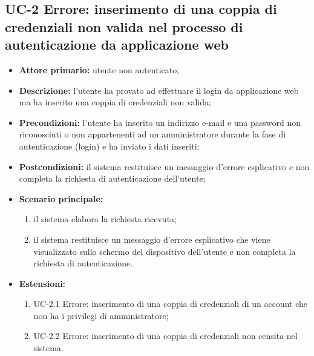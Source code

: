 \subsection{UC-2 Errore: inserimento di una coppia di credenziali non valida nel processo di autenticazione da applicazione web}
\begin{itemize}
	\item \textbf{Attore primario:} utente non autenticato;

	\item \textbf{Descrizione:} l'utente ha provato ad effettuare il login da applicazione web ma ha inserito una coppia di credenziali non valida;

	\item \textbf{Precondizioni:} l'utente ha inserito un indirizzo e-mail e una password non riconosciuti o non appartenenti ad un amministratore durante la fase di autenticazione (login) e ha inviato i dati inseriti;

	\item \textbf{Postcondizioni:} il sistema restituisce un messaggio d'errore esplicativo e non completa la richiesta di autenticazione dell'utente;

	\item \textbf{Scenario principale:}
	      \begin{enumerate}
		      \item il sistema elabora la richiesta ricevuta;
		      \item il sistema restituisce un messaggio d'errore esplicativo che viene visualizzato sullo schermo del dispositivo dell'utente e non completa la richiesta di autenticazione.
	      \end{enumerate}
	 \item \textbf{Estensioni:}
	 	\begin{enumerate}
		      \item UC-2.1 Errore: inserimento di una coppia di credenziali di un account che non ha i privilegi di amministratore;
		       \item UC-2.2 Errore: inserimento di una coppia di credenziali non censita nel sistema.
	        \end{enumerate}
\end{itemize}

